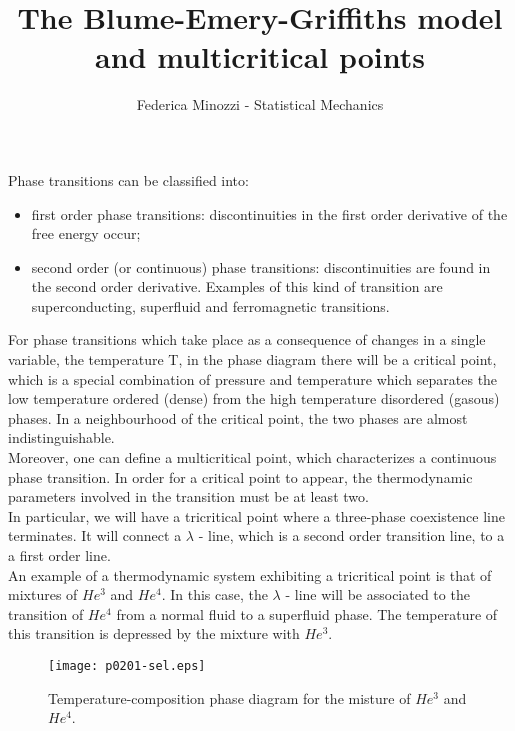 \documentclass[a4paper,11pt, notitlepage]{report}
\title{The Blume-Emery-Griffiths model and multicritical points}
\author{Federica Minozzi - Statistical Mechanics}}
\date{}
\begin{document}
\maketitle

Phase transitions can be classified into:
\begin{itemize}
\item first order phase transitions: discontinuities in the first order derivative of the free energy occur;
\item second order (or continuous) phase transitions: discontinuities are found in the second order derivative. Examples of this kind of transition are superconducting, superfluid and ferromagnetic transitions. 
\end{itemize}
For phase transitions which take place as a consequence of changes in a single variable, the temperature T, in the phase diagram there will be a critical point, which is a special combination of pressure and temperature which separates the low temperature ordered (dense) from the high temperature disordered (gasous) phases. In a neighbourhood of the critical point, the two phases are almost indistinguishable. \\
Moreover, one can define a multicritical point, which characterizes a continuous phase transition. In order for a critical point to appear, the thermodynamic parameters involved in the transition must be at least two. \\
In particular, we will have a tricritical point where a three-phase coexistence line terminates. It will connect a $\lambda$ - line, which is  a second order transition line, to a a first order line. \\

An example of a thermodynamic system exhibiting a tricritical point is that of mixtures of $He^3$ and $He^4$. In this case, the $\lambda$ - line will be associated to the transition of $He^4$ from a normal fluid to a superfluid phase. The temperature of this transition is depressed by the mixture with $He^3$. \\

\begin{figure}
\begin{center}
\texttt{[image: p0201-sel.eps]}
\end{center}
\caption{Temperature-composition phase diagram for the misture of $He^3$ and $He^4$.}
\label{fig:dessin}
\end{figure}
\end{document}
